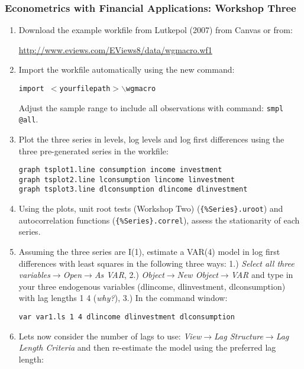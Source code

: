\documentclass[a4paper,10pt]{article}
\begin{document}
\small
\subsubsection*{Econometrics with Financial Applications: Workshop Three}
\begin{enumerate}
\item Download the example workfile from Lutkepol (2007) from Canvas or from:
\begin{center}
\url{http://www.eviews.com/EViews8/data/wgmacro.wf1}
\end{center}
\item Import the workfile automatically using the new command:
\begin{center}
\texttt{import $<$yourfilepath$>\backslash$wgmacro}
\end{center}
Adjust the sample range to include all observations with command: \texttt{smpl @all}.
\item Plot the three series in levels, log levels and log first differences using the three pre-generated series in the workfile:
\begin{center}
\texttt{graph tsplot1.line consumption income investment\\
graph tsplot2.line lconsumption lincome linvestment\\
graph tsplot3.line dlconsumption dlincome dlinvestment\\}
\end{center}
\item Using the plots, unit root tests (Workshop Two) (\texttt{\{\%Series\}.uroot}) and autocorrelation functions (\texttt{\{\%Series\}.correl}), assess the stationarity of each series.
\item Assuming the three series are I(1), estimate a VAR(4) model in log first differences with least squares in the following three ways: 1.) \emph{Select all three variables}$\rightarrow$\emph{Open}$\rightarrow$\emph{As VAR}, 2.) \emph{Object}$\rightarrow$\emph{New Object}$\rightarrow$\emph{VAR} and type in your three endogenous variables (dlincome, dlinvestment, dlconsumption) with lag lengths 1 4 (\emph{why?}), 3.) In the command window:
\begin{center}
\texttt{var var1.ls 1 4 dlincome dlinvestment dlconsumption}
\end{center}
\item Lets now consider the number of lags to use: \emph{View}$\rightarrow$\emph{Lag Structure}$\rightarrow$\emph{Lag Length Criteria} and then re-estimate the model using the preferred lag length:

\end{enumerate}
\end{document}
